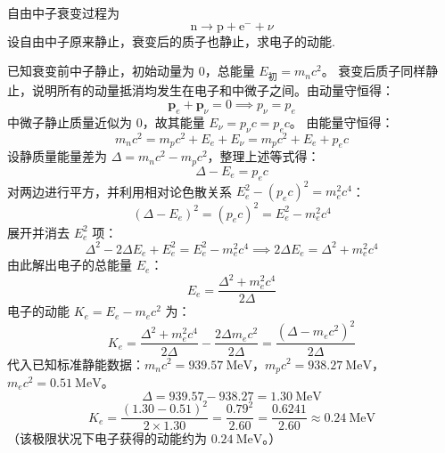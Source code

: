 \begin{exercise}\label{ex:9.16}
自由中子衰变过程为
$$ \mathrm{n} \longrightarrow \mathrm{p} + \mathrm{e}^- + \nu $$
设自由中子原来静止，衰变后的质子也静止，求电子的动能.
\end{exercise}
\begin{solution}
已知衰变前中子静止，初始动量为 $0$，总能量 $E_{\text{初}} = m_n c^2$。
衰变后质子同样静止，说明所有的动量抵消均发生在电子和中微子之间。由动量守恒得：
$$ \boldsymbol{p}_e + \boldsymbol{p}_\nu = 0 \implies p_\nu = p_e $$
中微子静止质量近似为 $0$，故其能量 $E_\nu = p_\nu c = p_e c$。
由能量守恒得：
$$ m_n c^2 = m_p c^2 + E_e + E_\nu = m_p c^2 + E_e + p_e c $$
设静质量能量差为 $\Delta = m_n c^2 - m_p c^2$，整理上述等式得：
$$ \Delta - E_e = p_e c $$
对两边进行平方，并利用相对论色散关系 $E_e^2 - (p_e c)^2 = m_e^2 c^4$：
$$ (\Delta - E_e)^2 = (p_e c)^2 = E_e^2 - m_e^2 c^4 $$
展开并消去 $E_e^2$ 项：
$$ \Delta^2 - 2 \Delta E_e + E_e^2 = E_e^2 - m_e^2 c^4 \implies 2 \Delta E_e = \Delta^2 + m_e^2 c^4 $$
由此解出电子的总能量 $E_e$：
$$ E_e = \frac{\Delta^2 + m_e^2 c^4}{2\Delta} $$
电子的动能 $K_e = E_e - m_e c^2$ 为：
$$ K_e = \frac{\Delta^2 + m_e^2 c^4}{2\Delta} - \frac{2\Delta m_e c^2}{2\Delta} = \frac{(\Delta - m_e c^2)^2}{2\Delta} $$
代入已知标准静能数据：$m_n c^2 = 939.57 \ \mathrm{MeV}$，$m_p c^2 = 938.27 \ \mathrm{MeV}$，$m_e c^2 = 0.51 \ \mathrm{MeV}$。
$$ \Delta = 939.57 - 938.27 = 1.30 \ \mathrm{MeV} $$
$$ K_e = \frac{(1.30 - 0.51)^2}{2 \times 1.30} = \frac{0.79^2}{2.60} = \frac{0.6241}{2.60} \approx 0.24 \ \mathrm{MeV} $$
（该极限状况下电子获得的动能约为 $0.24 \ \mathrm{MeV}$。）
\end{solution}

